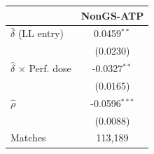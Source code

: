 \begin{tabular}{lc}
\toprule
 & NonGS-ATP \\
\midrule
$\hat{\delta}$ (LL entry) & 0.0459$^{**}$ \\
 & (0.0230) \\
$\hat{\delta}$ $\times$ Perf. dose & -0.0327$^{**}$ \\
 & (0.0165) \\
$\hat{\rho}$ & -0.0596$^{***}$ \\
 & (0.0088) \\
\midrule
Matches & 113,189 \\
\bottomrule
\end{tabular}

